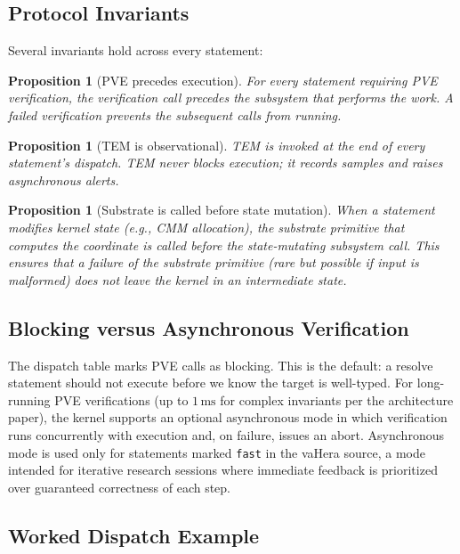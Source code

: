 \documentclass[11pt,twocolumn,a4paper]{article}
\newtheorem{proposition}[theorem]{Proposition}
\begin{document}
\subsection{Protocol Invariants}

Several invariants hold across every statement:

\begin{proposition}[PVE precedes execution]
For every statement requiring PVE verification, the verification call precedes the subsystem that performs the work. A failed verification prevents the subsequent calls from running.
\end{proposition}

\begin{proposition}[TEM is observational]
TEM is invoked at the end of every statement's dispatch. TEM never blocks execution; it records samples and raises asynchronous alerts.
\end{proposition}

\begin{proposition}[Substrate is called before state mutation]
When a statement modifies kernel state (e.g., CMM allocation), the substrate primitive that computes the coordinate is called \emph{before} the state-mutating subsystem call. This ensures that a failure of the substrate primitive (rare but possible if input is malformed) does not leave the kernel in an intermediate state.
\end{proposition}

\subsection{Blocking versus Asynchronous Verification}

The dispatch table marks PVE calls as blocking. This is the default: a resolve statement should not execute before we know the target is well-typed. For long-running PVE verifications (up to $1\,\text{ms}$ for complex invariants per the architecture paper), the kernel supports an optional asynchronous mode in which verification runs concurrently with execution and, on failure, issues an abort. Asynchronous mode is used only for statements marked \texttt{fast} in the vaHera source, a mode intended for iterative research sessions where immediate feedback is prioritized over guaranteed correctness of each step.

\subsection{Worked Dispatch Example}
\end{document}
